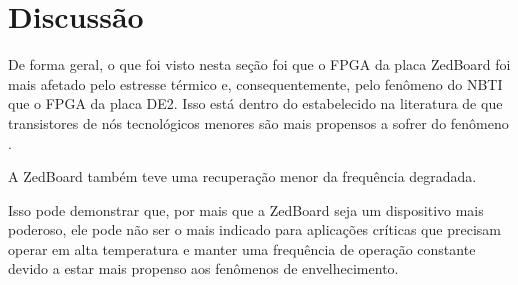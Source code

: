 \section{Discussão}
\label{ResDiscussao}

De forma geral, o que foi visto nesta seção foi que o FPGA da placa ZedBoard foi mais afetado pelo estresse térmico e, consequentemente, pelo fenômeno do NBTI que o FPGA da placa DE2. Isso está dentro do estabelecido na literatura de que transistores de nós tecnológicos menores são mais propensos a sofrer do fenômeno \cite{Zeng}.

A ZedBoard também teve uma recuperação menor da frequência degradada.

Isso pode demonstrar que, por mais que a ZedBoard seja um dispositivo mais poderoso, ele pode não ser o mais indicado para aplicações críticas que precisam operar em alta temperatura e manter uma frequência de operação constante devido a estar mais propenso aos fenômenos de envelhecimento.